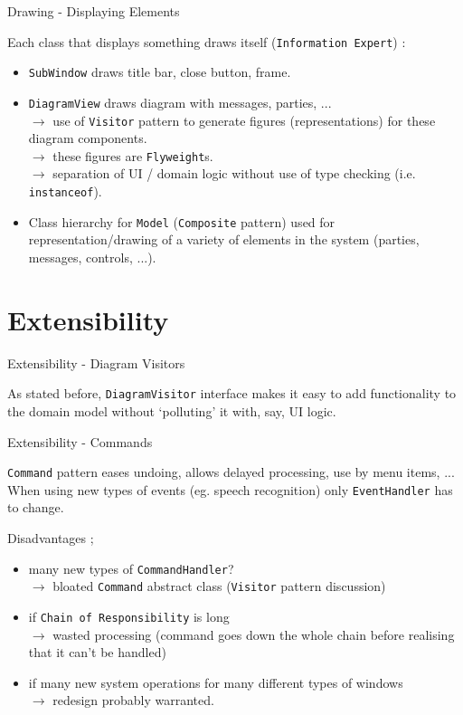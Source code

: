 \documentclass[10pt]{beamer}
\begin{document}
\begin{frame}[fragile]{Drawing - Displaying Elements}
	\begin{center}
	Each class that displays something draws itself (\texttt{Information Expert}) :
	\begin{itemize}
	\item \texttt{SubWindow} draws title bar, close button, frame.
	\item \texttt{DiagramView} draws diagram with messages, parties, ...
	\\$\rightarrow$ use of \texttt{Visitor} pattern to generate figures (representations) for these diagram components.
	\\$\rightarrow$ these figures are \texttt{Flyweight}s.
	\\$\rightarrow$ separation of UI / domain logic without use of type checking (i.e. \texttt{instanceof}).
	\item Class hierarchy for \texttt{Model} (\texttt{Composite} pattern) used for representation/drawing of a variety of elements in the system (parties, messages, controls, ...).
	\end{itemize}
	\end{center}
\end{frame}

\section{Extensibility}

\begin{frame}[fragile]{Extensibility - Diagram Visitors}
	\begin{center}
		As stated before, \texttt{DiagramVisitor} interface makes it easy to add functionality to the domain model without `polluting' it with, say, UI logic.
	\end{center}
\end{frame}

\begin{frame}[fragile]{Extensibility - Commands}
	\begin{center}
	\texttt{Command} pattern eases undoing, allows delayed processing, use by menu items, ... When using new types of events (eg. speech recognition) only \texttt{EventHandler} has to change.
	
	\vspace{0.5cm} Disadvantages ; 
	\begin{itemize}
	\item many new types of \texttt{CommandHandler}?
	\\ $\rightarrow$ bloated \texttt{Command} abstract class (\texttt{Visitor} pattern discussion)
	\item if \texttt{Chain of Responsibility} is long
	\\ $\rightarrow$ wasted processing (command goes down the whole chain before realising that it can't be handled)
	\item if many new system operations for many different types of windows 
	\\ $\rightarrow$ redesign probably warranted.
	\end{itemize}
	\end{center}
\end{frame}
\end{document}
